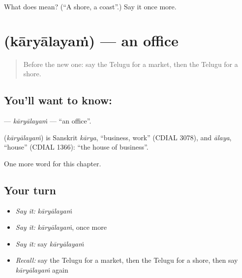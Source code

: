 \begin{tcolorbox}[breakable,colback=teal!4,colframe=teal!35!black,title={Before you move on}]
What does  mean? (\textquotedblleft{}A shore, a coast\textquotedblright{}.) Say it once more.
\end{tcolorbox}
\section[\texorpdfstring{\te{కార్యాలయం} (kāryālayaṁ)}{కార్యాలయం (kāryālayaṁ)}]{ (kāryālayaṁ) — an office}

\label{lesson:TE-C104-karyalayam}



\begin{quote}
Before the new one: say the Telugu for a market, then the Telugu for a shore.
\end{quote}

\subsection*{You'll want to know: }
\textbf{} — \emph{kāryālayaṁ} — \textquotedblleft{}an office\textquotedblright{}.

\begin{cousinweb}
\textbf{} (\emph{kāryālayaṁ}) is Sanskrit \emph{kārya}, \textquotedblleft{}business, work\textquotedblright{} (CDIAL 3078), and \emph{ālaya}, \textquotedblleft{}house\textquotedblright{} (CDIAL 1366): \textquotedblleft{}the house of business\textquotedblright{}.
\end{cousinweb}

\begin{grammarlens}[title={What you've built}]
One more word for this chapter.
\end{grammarlens}

\subsection*{Your turn}
\begin{itemize}
\raggedright
  \item \emph{Say it:} \emph{kāryālayaṁ}
  \item \emph{Say it:} \emph{kāryālayaṁ}, once more
  \item \emph{Say it:} say \emph{kāryālayaṁ}
  \item \emph{Recall:} say the Telugu for a market, then the Telugu for a shore, then say \emph{kāryālayaṁ} again
\end{itemize}

